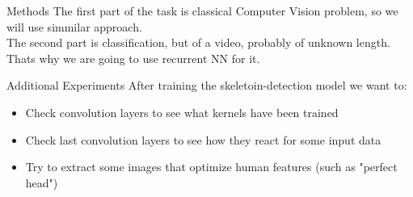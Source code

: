 \documentclass[aspectratio=169]{beamer}
\begin{document}
\begin{frame}{Methods}
The first part of the task is classical Computer Vision problem, so we will use simmilar approach.\\
The second part is classification, but of a video, probably of unknown length. Thats why we are going to use recurrent NN for it.\\
\end{frame}


\begin{frame}{Additional Experiments}
After training the skeletoin-detection model we want to:
\begin{itemize}
    \item Check convolution layers to see what kernels have been trained
    \item Check last convolution layers to see how they react for some input data
    \item Try to extract some images that optimize human features (such as "perfect head")
\end{itemize}
\end{frame}
\end{document}
